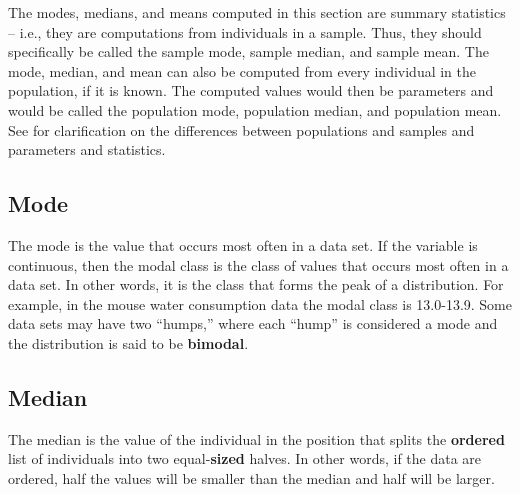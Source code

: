 \documentclass[10pt,openany]{book}\usepackage[]{graphicx}\usepackage[]{color}
\begin{document}
The modes, medians, and means computed in this section are summary statistics -- i.e., they are computations from individuals in a sample.  Thus, they should specifically be called the sample mode, sample median, and sample mean.  The mode, median, and mean can also be computed from every individual in the population, if it is known.  The computed values would then be parameters and would be called the population mode, population median, and population mean.  See  for clarification on the differences between populations and samples and parameters and statistics.


\vspace{-12pt}

\subsection{Mode}
The mode is the value that occurs most often in a data set.  If the variable is continuous, then the modal class is the class of values that occurs most often in a data set.  In other words, it is the class that forms the peak of a distribution.  For example, in the mouse water consumption data  the modal class is 13.0-13.9.  Some data sets may have two ``humps,'' where each ``hump'' is considered a mode and the distribution is said to be \textbf{bimodal}.


\vspace{-12pt}

\subsection{Median} \label{sec:Median}
The median is the value of the individual in the position that splits the \textbf{ordered} list of individuals into two equal-\textbf{sized} halves.  In other words, if the data are ordered, half the values will be smaller than the median and half will be larger.
\end{document}
